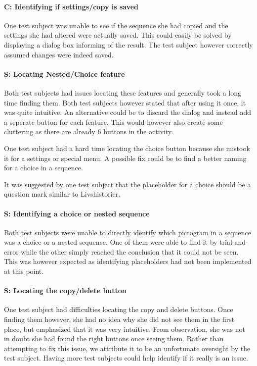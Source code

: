 \paragraph{C: Identifying if settings/copy is saved}
One test subject was unable to see if the sequence she had copied and the settings she had altered were actually saved. This could easily be solved by displaying a dialog box informing of the result. The test subject however correctly assumed changes were indeed saved.

\paragraph{S: Locating Nested/Choice feature}
Both test subjects had issues locating these features and generally took a long time finding them. Both test subjects however stated that after using it once, it was quite intuitive. An alternative could be to discard the dialog and instead add a seperate button for each feature. This would however also create some cluttering as there are already 6 buttons in the activity.

One test subject had a hard time locating the choice button because she mistook it for a settings or special menu. A possible fix could be to find a better naming for a choice in a sequence.

It was suggested by one test subject that the placeholder for a choice should be a question mark similar to Livshistorier.

\paragraph{S: Identifying a choice or nested sequence}
Both test subjects were unable to directly identify which pictogram in a sequence was a choice or a nested sequence. One of them were able to find it by trial-and-error while the other simply reached the conclusion that it could not be seen. This was however expected as identifying placeholders had not been implemented at this point.

\paragraph{S: Locating the copy/delete button}
One test subject had difficulties locating the copy and delete buttons. Once finding them however, she had no idea why she did not see them in the first place, but emphasized that it was very intuitive. From observation, she was not in doubt she had found the right buttons once seeing them. Rather than attempting to fix this issue, we attribute it to be an unfortunate oversight by the test subject. Having more test subjects could help identify if it really is an issue.